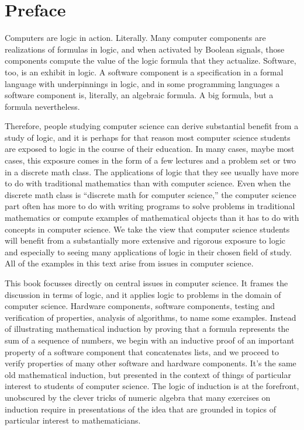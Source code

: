 \chapter{Preface}
\label{ch:Preface}

Computers are logic in action. Literally.
Many computer components are realizations of formulas in logic,
and when activated by Boolean signals, those components
compute the value of the logic formula that they actualize.
Software, too, is an exhibit in logic.
A software component is a specification in a formal language
with underpinnings in logic,
and in some programming languages a software component
is, literally, an algebraic formula.
A big formula, but a formula nevertheless.

Therefore, people studying computer science
can derive substantial benefit from a study of logic,
and it is perhaps for that reason most computer science students 
are exposed to logic in the course of their education.
In many cases, maybe most cases, this exposure comes
in the form of a few lectures and a problem set or two
in a discrete math class. The applications of logic that
they see usually have more to do with traditional mathematics
than with computer science. Even when the discrete math class
is ``discrete math for computer science,'' the computer science
part often has more to do with writing programs to solve problems
in traditional mathematics or compute examples of
mathematical objects than it has to do with
concepts in computer science.
We take the view that computer science students will
benefit from a substantially more extensive and rigorous
exposure to logic and especially to seeing many applications of
logic in their chosen field of study.
All of the examples in this text arise from issues in computer science.

This book focusses directly on central issues
in computer science.
It frames the discussion in terms of logic,
and it applies logic to problems in the domain of computer science.
Hardware components, software components,
testing and verification of properties, analysis of algorithms,
to name some examples.
Instead of illustrating mathematical induction by  proving
that a formula represents the sum of a sequence of numbers,
we begin with an inductive proof of an important property of 
a software component that concatenates lists, 
and we proceed to verify properties of
many other software and hardware components.
It's the same old mathematical induction, but presented
in the context of things of particular interest to
students of computer science.
The logic of induction is at the forefront, 
unobscured by the clever tricks of numeric algebra
that many exercises on induction require in
presentations of the idea that are grounded in topics
of particular interest to mathematicians.


